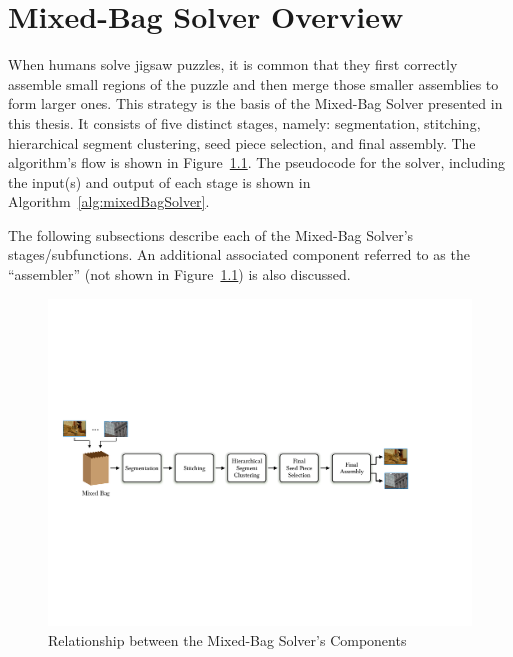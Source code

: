 \chapter{Mixed-Bag Solver Overview}\label{chap:mixedBagSolver}

When humans solve jigsaw puzzles, it is common that they first correctly assemble small regions of the puzzle and then merge those smaller assemblies to form larger ones.  This strategy is the basis of the Mixed-Bag Solver presented in this thesis.  It consists of five distinct stages, namely: segmentation, stitching, hierarchical segment clustering, seed piece selection, and final assembly.  The algorithm's flow is shown in Figure~\ref{fig:multipuzzleSolverArchitecture}.  The pseudocode for the solver, including the input(s) and output of each stage is shown in Algorithm~\ref{alg:mixedBagSolver}. 

The following subsections describe each of the Mixed-Bag Solver's stages/subfunctions.  An additional associated component referred to as the ``assembler'' (not shown in Figure~\ref{fig:multipuzzleSolverArchitecture}) is also discussed.

\begin{figure}[ht!]
	\centering
		\includegraphics[width=1.0\textwidth]{images/cropped_algorithm_structure_overview.pdf}
	\caption{Relationship between the Mixed-Bag Solver's Components}\label{fig:multipuzzleSolverArchitecture}
\end{figure}

